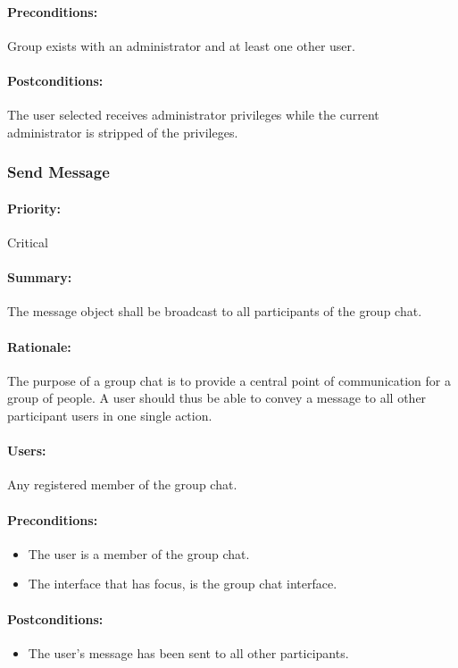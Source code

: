 \documentclass[11pt]{article}
\begin{document}
\paragraph{Preconditions:}
Group exists with an administrator and at least one other user.
\paragraph{{Postconditions:}}
The user selected receives administrator privileges while the current administrator is stripped of the privileges.

\subsubsection{Send Message} \label{UC-send-message}
\paragraph{Priority:} Critical
\paragraph{Summary:} The message object shall be broadcast to all participants of the group chat.
\paragraph{Rationale:} The purpose of a group chat is to provide a central point of communication for a group of people. A user should thus be able to convey a message to all other participant users in one single action.
\paragraph{Users:} Any registered member of the group chat.
\paragraph{Preconditions:} 
\begin{itemize}
\item The user is a member of the group chat.
\item The interface that has focus, is the group chat interface.
\end{itemize}
\paragraph{{Postconditions:}}
\begin{itemize}
\item The user's message has been sent to all other participants.
\end{itemize}
\end{document}
